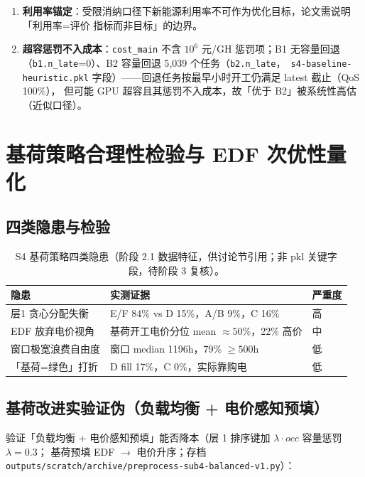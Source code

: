 \documentclass{internal-report}
\begin{document}
\begin{enumerate}
{        「联合优化 vs 顺序优化」的耦合增益}（后者对照未建立）。
  \item \textbf{利用率锚定}：受限消纳口径下新能源利用率不可作为优化目标，论文需说明「利用率=评价
        指标而非目标」的边界。
  \item \textbf{超容惩罚不入成本}：\texttt{cost\_main} 不含 $10^6$ 元/GH 惩罚项；B1 无容量回退
        （\texttt{b1.n\_late}=0）、B2 容量回退 5{,}039 个任务（\texttt{b2.n\_late}，\texttt{
        s4-baseline-heuristic.pkl} 字段）——回退任务按最早小时开工仍满足 latest 截止（QoS 100\%），
        但可能 GPU 超容且其惩罚不入成本，故「优于 B2」被系统性高估（近似口径）。
\end{enumerate}

\section{基荷策略合理性检验与 EDF 次优性量化}
\label{sec:baseload-test}

\subsection{四类隐患与检验}

\begin{table}[H]
\centering
\footnotesize
\begin{tabular}{lll}
\toprule
隐患 & 实测证据 & 严重度 \\
\midrule
层1 贪心分配失衡 & E/F 84\% vs D 15\%，A/B 9\%，C 16\% & 高 \\
EDF 放弃电价视角 & 基荷开工电价分位 mean $\approx 50\%$，22\% 高价 & 中 \\
窗口极宽浪费自由度 & 窗口 median 1196h，79\% $\ge 500$h & 低 \\
「基荷=绿色」打折 & D fill 17\%，C 0\%，实际靠购电 & 低 \\
\bottomrule
\end{tabular}
\caption{S4 基荷策略四类隐患（阶段 2.1 数据特征，供讨论节引用；非 pkl 关键字段，待阶段 3 复核）。}
\label{tab:pitfall}
\end{table}

\subsection{基荷改进实验证伪（负载均衡 + 电价感知预填）}

验证「负载均衡 + 电价感知预填」能否降本（层 1 排序键加 $\lambda\cdot occ$ 容量惩罚 $\lambda{=}0.3$；
基荷预填 EDF $\to$ 电价升序；存档 \texttt{outputs/scratch/archive/preprocess-sub4-balanced-v1.py}）：
\end{document}
